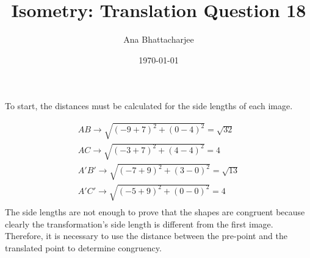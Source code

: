 \documentclass{article}
\begin{document}
\title{Isometry: Translation Question 18}
\author{Ana Bhattacharjee}
\date{\today}
\maketitle{}
\begin{center}
  To start, the distances must be calculated for the side lengths of each image.
  \par
  \begin{align}
    AB \rightarrow \sqrt{(-9 + 7)^2 + (0 - 4)^2} = \sqrt{32} \\
    AC \rightarrow \sqrt{(-3 + 7)^2 + (4 - 4)^2} = 4 \\
    A'B' \rightarrow \sqrt{(-7 + 9)^2 + (3 - 0)^2} = \sqrt{13} \\
    A'C' \rightarrow \sqrt{(-5 + 9)^2 + (0 - 0)^2} = 4 \\
  \end{align}
The side lengths are not enough to prove that the shapes are congruent because clearly the transformation's side length is different from the first image. Therefore, it is necessary to use the distance between the pre-point and the translated point to determine congruency. 
\end{center}
\end{document}
